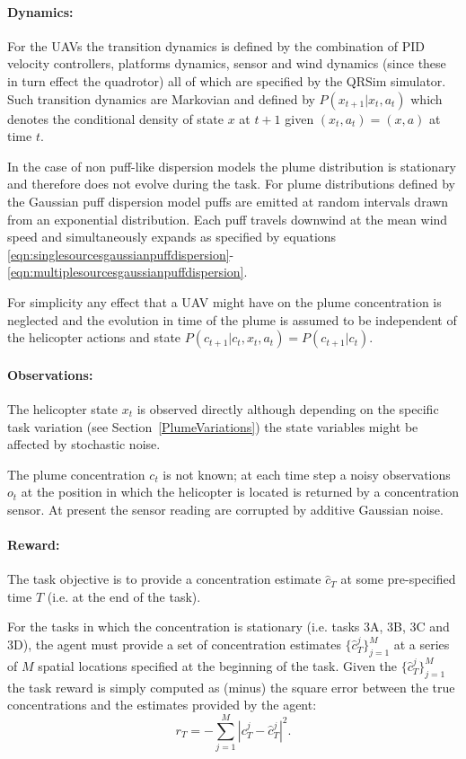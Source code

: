 \documentclass[a4paper,11pt]{report}
\newcommand{\sname}{QRSim\xspace}
\begin{document}
\paragraph{Dynamics:} For the UAVs the transition dynamics is defined by the combination of PID velocity controllers, platforms dynamics, sensor and wind dynamics (since these in turn effect the quadrotor) all of which are specified by the \sname simulator. Such transition dynamics are Markovian and defined by $P(x_{t+1}|x_t,a_t)$ which denotes the conditional density of state $x$ at $t+1$ given $(x_t,a_t) = (x,a)$ at time $t$. 

In the case of non puff-like dispersion models the plume distribution is stationary and therefore does not evolve during the task. For plume distributions defined by the Gaussian puff dispersion model puffs are emitted at random intervals drawn from an exponential distribution. Each puff travels downwind at the mean wind speed and simultaneously expands as specified by equations \ref{eqn:singlesourcesgaussianpuffdispersion}-\ref{eqn:multiplesourcesgaussianpuffdispersion}.

For simplicity any effect that a UAV might have on the plume concentration is neglected and the evolution in time of the plume is assumed to be independent of the helicopter actions and state  $P(c_{t+1}|c_t,x_t,a_t)=P(c_{t+1}|c_t)$.


\paragraph{Observations:} The helicopter state $x_t$ is observed directly although depending on the specific task variation (see Section~\ref{PlumeVariations}) the state variables might be affected by stochastic noise.

The plume concentration $c_t$ is not known; at each time step a noisy observations $o_t$ at the position in which the helicopter is located is returned by a concentration sensor. At present the sensor reading are corrupted by additive Gaussian noise. 

\paragraph{Reward:} 
The task objective is to provide a concentration estimate $\hat{c}_T$ at some pre-specified time $T$ (i.e. at the end of the task).
 
For the tasks in which the concentration is stationary (i.e. tasks 3A, 3B, 3C and 3D), the agent must provide a set of concentration estimates $\{\hat c^j_T\}^M_{j=1}$ at a series of $M$ spatial locations specified at the beginning of the task. 
Given the $\{\hat c^j_T\}^M_{j=1}$ the task reward is simply computed as (minus) the square error between the true concentrations and the estimates provided by the agent:
$$
r_T = - \sum^M_{j=1} | c^j_T - \hat{c}^j_T |^2 .
$$
\end{document}
